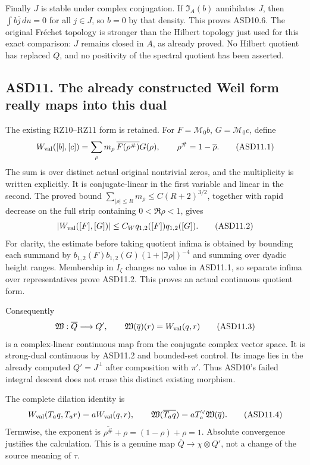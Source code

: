 Finally \(J\) is stable under complex conjugation. If
\(\mathfrak I_A(b)\) annihilates \(J\), then \(\int b\overline j\,du=0\)
for all \(j\in J\), so \(b=0\) by that density. This proves ASD10.6. The
original Fréchet topology is stronger than the Hilbert topology just
used for this exact comparison: \(J\) remains closed in \(A\), as
already proved. No Hilbert quotient has replaced \(Q\), and no
positivity of the spectral quotient has been asserted.

\subsection{ASD11. The already constructed Weil form really maps into
this
dual}\label{asd11.-the-already-constructed-weil-form-really-maps-into-this-dual}

The existing RZ10--RZ11 form is retained. For \(F=\mathcal M_0b\),
\(G=\mathcal M_0c\), define \[
 W_{\rm val}([b],[c])
 =\sum_{\rho}m_\rho\,
       \overline{F(\rho^\#)}G(\rho),\qquad
 \rho^\#=1-\overline\rho .
 \tag{ASD11.1}
\] The sum is over distinct actual original nontrivial zeros, and the
multiplicity is written explicitly. It is conjugate-linear in the first
variable and linear in the second. The proved bound
\(\sum_{|\rho|\le R}m_\rho\le C(R+2)^{3/2}\), together with rapid
decrease on the full strip containing \(0<\Re\rho<1\), gives \[
 |W_{\rm val}([F],[G])|
 \le C_W q_{1,2}([F])q_{1,2}([G]).
 \tag{ASD11.2}
\] For clarity, the estimate before taking quotient infima is obtained
by bounding each summand by \(b_{1,2}(F)b_{1,2}(G)(1+|\Im\rho|)^{-4}\)
and summing over dyadic height ranges. Membership in \(I_\zeta\) changes
no value in ASD11.1, so separate infima over representatives prove
ASD11.2. This proves an actual continuous quotient form.

Consequently \[
 \mathfrak W:\overline Q\longrightarrow Q',
 \qquad \mathfrak W(\overline q)(r)=W_{\rm val}(q,r)
 \tag{ASD11.3}
\] is a complex-linear continuous map from the conjugate complex vector
space. It is strong-dual continuous by ASD11.2 and bounded-set control.
Its image lies in the already computed \(Q'=J^\perp\) after composition
with \(\pi'\). Thus ASD10's failed integral descent does not erase this
distinct existing morphism.

The complete dilation identity is \[
 W_{\rm val}(T_aq,T_ar)=a W_{\rm val}(q,r),\qquad
 \mathfrak W(\overline{T_aq})
 =aT_a^\vee\mathfrak W(\overline q).
 \tag{ASD11.4}
\] Termwise, the exponent is
\(\overline{\rho^\#}+\rho=(1-\rho)+\rho=1\). Absolute convergence
justifies the calculation. This is a genuine map
\(\overline Q\to\chi\otimes Q'\), not a change of the source meaning of
\(\tau\).

